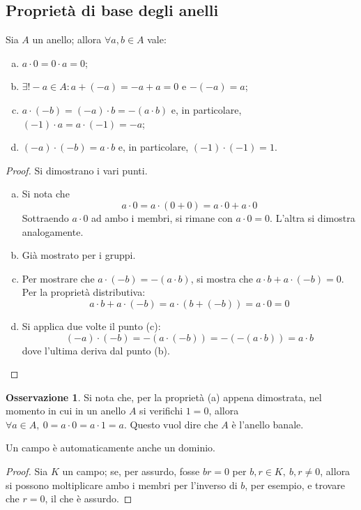 \documentclass[11pt, a4paper]{scrartcl}
\theoremstyle{definition}
\numberwithin{esempio}{section}
\theoremstyle{definition}
\newtheorem{obs}{Osservazione}
\numberwithin{obs}{section}
\numberwithin{nota}{section}
\numberwithin{equation}{subsection}
\begin{document}
\subsection{Propriet\`a di base degli anelli}
\begin{lemma}
	{}{}
	Sia $A$ un anello; allora $\forall a,b \in A$ vale:
	\begin{enumerate}[(a).]
		\item $a \cdot 0 = 0 \cdot a = 0$;
		\item $\exists ! -a \in A : a+(-a) = -a +a = 0$ e $-(-a) = a$;
		\item $a \cdot (-b) = (-a)\cdot b = - (a\cdot b)$ e, in particolare, $(-1) \cdot a = a\cdot (-1) = -a$;
		\item $(-a)\cdot (-b) = a \cdot b$ e, in particolare, $(-1)\cdot (-1)  = 1$.
	\end{enumerate}
	\begin{proof}
		Si dimostrano i vari punti.
		\begin{enumerate}[(a).]
			\item Si nota che
				\[
				a \cdot  0 = a \cdot (0+0) = a \cdot 0 + a \cdot  0
				\] 
				Sottraendo $a \cdot 0$ ad ambo i membri, si rimane con $a \cdot  0 = 0$. 
				L'altra si dimostra analogamente.
			\item Gi\`a mostrato per i gruppi.
			\item Per mostrare che $a \cdot (-b) = - (a\cdot b)$, si mostra che $a \cdot b + a\cdot (-b) = 0$.
				Per la propriet\`a distributiva:
				\[
				a \cdot b + a \cdot  (-b) = a \cdot (b+(-b)) = a \cdot 0 = 0
				\] 
			\item Si applica due volte il punto (c):
				\[
					(-a) \cdot (-b) = -(a \cdot (-b)) = - (-(a \cdot b)) = a \cdot b
				\] 
				dove l'ultima deriva dal punto (b).
		\end{enumerate}
	\end{proof}
\end{lemma}
\begin{obs}
	Si nota che, per la propriet\`a (a) appena dimostrata, nel momento in cui in un anello $A$ si verifichi $1 = 0$, allora $\forall a \in A, \ 0=a \cdot  0 = a \cdot  1 = a$. 
	Questo vuol dire che $A$ \`e l'anello banale.
\end{obs}
\begin{prop}
	{}{}
	Un campo \`e automaticamente anche un dominio.
	\begin{proof}
		Sia $K$ un campo; se, per assurdo, fosse $br = 0 $ per $b,r \in K, \ b,r \neq 0$, allora si possono moltiplicare ambo i membri per l'inverso di $b$, per esempio, e trovare che $r =0$, il che \`e assurdo.
	\end{proof}
\end{prop}
\end{document}
